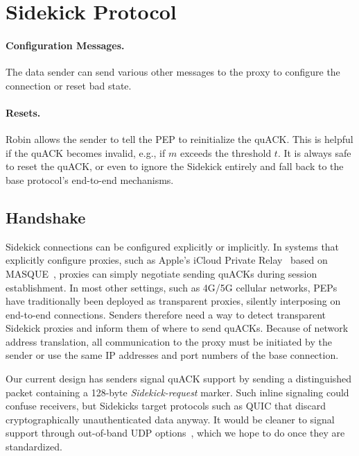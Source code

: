 \section{Sidekick Protocol}
\label{sec:sidekick:protocol}

\paragraph{Configuration Messages.}

The data sender can send various other messages to the proxy
to configure the connection or reset bad state.

\paragraph{Resets.}
Robin allows the sender to tell the PEP to reinitialize the quACK.
This is helpful if the quACK becomes
invalid, e.g., if $m$ exceeds the threshold $t$. It is
always safe to reset the quACK, or even to ignore the Sidekick entirely and
fall back to the base protocol's end-to-end mechanisms.

\subsection{Handshake}
\label{sec:sidekick:protocol:handshake}

Sidekick connections can be configured explicitly or implicitly.  In systems that
explicitly configure proxies, such as Apple's iCloud Private Relay~\cite{icloud-private-relay}
based on MASQUE~\cite{kosek2021masque,kramer2021masquepep}, proxies can simply negotiate
sending quACKs during session establishment.  In most other settings,
such as 4G/5G cellular networks, PEPs have traditionally been deployed
as transparent proxies, silently interposing on end-to-end
connections.  Senders therefore need a way to detect transparent Sidekick
proxies and inform them of where to send quACKs.  Because of network
address translation, all communication to the proxy must be initiated
by the sender or use the same IP addresses and port numbers of the
base connection.

Our current design has senders signal quACK support by sending a
distinguished packet containing a 128-byte \emph{Sidekick-request} marker.  Such
inline signaling could confuse receivers, but Sidekicks target
protocols such as QUIC that discard cryptographically unauthenticated
data anyway.  It would be cleaner to signal support through
out-of-band UDP options~\cite{ietf-tsvwg-udp-options-28}, which we hope to do
once they are standardized.

